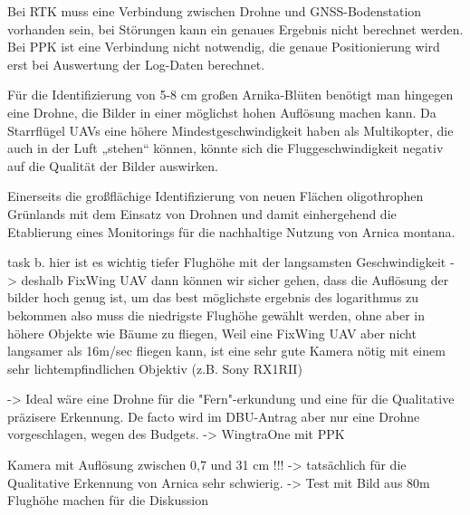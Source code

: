 Bei RTK muss eine Verbindung zwischen Drohne und GNSS-Bodenstation vorhanden sein, bei Störungen kann ein genaues Ergebnis nicht berechnet werden. Bei PPK ist eine Verbindung nicht notwendig, die genaue Positionierung wird erst bei Auswertung der Log-Daten berechnet. 



Für die Identifizierung von 5-8 cm großen Arnika-Blüten benötigt man hingegen eine Drohne, die Bilder in einer möglichst hohen Auflösung machen kann. Da Starrflügel UAVs eine höhere Mindestgeschwindigkeit haben als Multikopter, die auch in der Luft „stehen“ können, könnte sich die Fluggeschwindigkeit negativ auf die Qualität der Bilder auswirken. 

Einerseits die großflächige Identifizierung von neuen Flächen oligothrophen Grünlands mit dem Einsatz von Drohnen und damit einhergehend die Etablierung eines Monitorings für die nachhaltige Nutzung von Arnica montana.



task b.
hier ist es wichtig tiefer Flughöhe mit der langsamsten Geschwindigkeit -> deshalb FixWing UAV
dann können wir sicher gehen, dass die Auflösung der bilder hoch genug ist, um das best möglichste ergebnis des logarithmus zu bekommen
also muss die niedrigste Flughöhe gewählt werden, ohne aber in höhere Objekte wie Bäume zu fliegen, Weil eine FixWing UAV aber nicht langsamer als 16m/sec fliegen kann, ist eine sehr gute Kamera nötig mit einem sehr lichtempfindlichen Objektiv (z.B. Sony RX1RII)

-> Ideal wäre eine Drohne für die "Fern"-erkundung und eine für die Qualitative präzisere Erkennung. De facto wird im DBU-Antrag aber nur eine Drohne vorgeschlagen, wegen des Budgets. -> WingtraOne mit PPK

Kamera mit Auflösung zwischen 0,7 und 31 cm !!! -> tatsächlich für die Qualitative Erkennung von Arnica sehr schwierig. -> Test mit Bild aus 80m Flughöhe machen für die Diskussion

